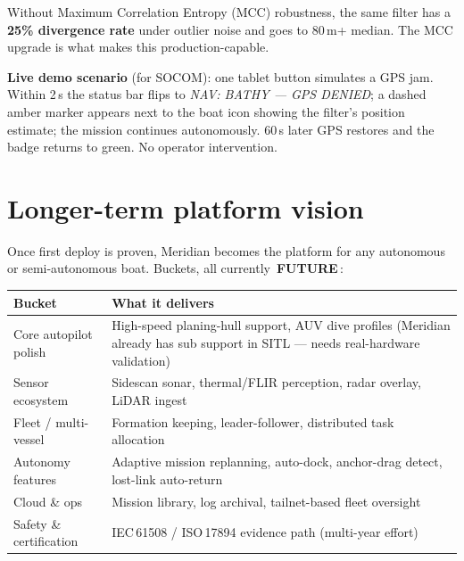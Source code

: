 \documentclass[10pt,a4paper]{article}
\newcommand{\statusfuture}{{\color{white}\colorbox{mDim}{\small\bfseries\,FUTURE\,}}}
\begin{document}
\vspace{4pt}
Without Maximum Correlation Entropy (MCC) robustness, the same filter
has a \textbf{25\% divergence rate} under outlier noise and goes to
80\,m+ median. The MCC upgrade is what makes this production-capable.

\textbf{Live demo scenario} (for SOCOM): one tablet button simulates a
GPS jam. Within 2\,s the status bar flips to \textit{NAV: BATHY ---
GPS DENIED}; a dashed amber marker appears next to the boat icon
showing the filter's position estimate; the mission continues
autonomously. 60\,s later GPS restores and the badge returns to green.
No operator intervention.

\section{Longer-term platform vision}
Once first deploy is proven, Meridian becomes the platform for any
autonomous or semi-autonomous boat. Buckets, all currently
\statusfuture:

\begin{tabularx}{\textwidth}{@{}l X@{}}
\toprule
\textbf{Bucket} & \textbf{What it delivers} \\
\midrule
\rowcolor{mRow} Core autopilot polish & High-speed planing-hull support, AUV dive profiles (Meridian already has sub support in SITL — needs real-hardware validation) \\
Sensor ecosystem & Sidescan sonar, thermal/FLIR perception, radar overlay, LiDAR ingest \\
\rowcolor{mRow} Fleet / multi-vessel & Formation keeping, leader-follower, distributed task allocation \\
Autonomy features & Adaptive mission replanning, auto-dock, anchor-drag detect, lost-link auto-return \\
\rowcolor{mRow} Cloud \& ops & Mission library, log archival, tailnet-based fleet oversight \\
Safety \& certification & IEC\,61508 / ISO\,17894 evidence path (multi-year effort) \\
\bottomrule
\end{tabularx}

\end{document}
